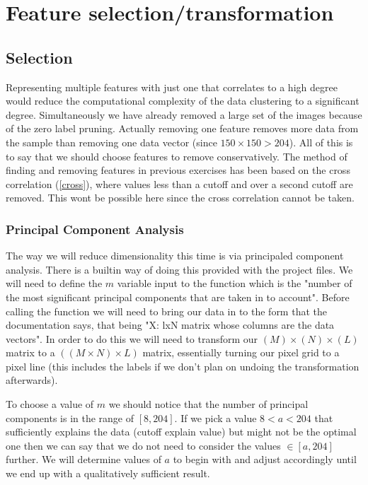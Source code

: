 \documentclass[12pt, a4paper]{article}
\begin{document}
\section{Feature selection/transformation}

\subsection{Selection}

Representing multiple features with just one that correlates to a high degree would reduce the computational complexity of the data clustering to a significant degree. Simultaneously we have already removed a large set of the images because of the zero label pruning. Actually removing one feature removes more data from the sample than removing one data vector (since $150\times150>204$). All of this is to say that we should choose features to remove conservatively. The method of finding and removing features in previous exercises has been based on the cross correlation (\ref{cross}), where values less than a cutoff and over a second cutoff are removed. This wont be possible here since the cross correlation cannot be taken.
\newline

\subsubsection{Principal Component Analysis}

The way we will reduce dimensionality this time is via principaled component analysis. There is a builtin way of doing this provided with the project files. We will need to define the $m$ variable input to the function which is the "number of the most significant principal components that are taken in to account". Before calling the function we will need to bring our data in to the form that the documentation says, that being "X: lxN matrix whose columns are the data vectors". In order to do this we will need to transform our $(M)\times (N)\times (L)$ matrix to a $((M\times N) \times L)$ matrix, essentially turning our pixel grid to a pixel line (this includes the labels if we don't plan on undoing the transformation afterwards).
\newline

To choose a value of $m$ we should notice that the number of principal components is in the range of $[8,204]$. If we pick a value $8<a<204$ that sufficiently explains the data (cutoff explain value) but might not be the optimal one then we can say that we do not need to consider the values $\in[a,204]$ further. We will determine values of $a$ to begin with and adjust accordingly until we end up with a qualitatively sufficient result.
\newline
\end{document}
